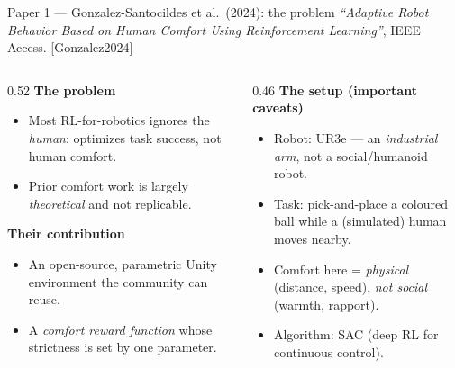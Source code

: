 \documentclass[aspectratio=169,10pt]{beamer}
\newcommand{\refnum}[1]{{\footnotesize\color{giuaccent}[#1]}}
\begin{document}
\begin{frame}{Paper 1 --- Gonzalez-Santocildes et al.\ (2024): the problem}
  \footnotesize \emph{``Adaptive Robot Behavior Based on Human Comfort Using Reinforcement Learning''}, IEEE Access. \refnum{Gonzalez2024}
  \vspace{0.4em}
  \begin{columns}[T]
    \begin{column}{0.52\textwidth}
      \textbf{The problem}
      \begin{itemize}\footnotesize
        \item Most RL-for-robotics ignores the \emph{human}: optimizes task success, not human comfort.
        \item Prior comfort work is largely \emph{theoretical} and \alert{not replicable}.
      \end{itemize}
      \textbf{Their contribution}
      \begin{itemize}\footnotesize
        \item An open-source, parametric \alert{Unity} environment the community can reuse.
        \item A \emph{comfort reward function} whose strictness is set by one parameter.
      \end{itemize}
    \end{column}
    \begin{column}{0.46\textwidth}
      \textbf{The setup (important caveats)}
      \begin{itemize}\footnotesize
        \item Robot: \alert{UR3e} --- an \emph{industrial arm}, not a social/humanoid robot.
        \item Task: pick-and-place a coloured ball while a (simulated) human moves nearby.
        \item Comfort here = \emph{physical} (distance, speed), \emph{not social} (warmth, rapport).
        \item Algorithm: \alert{SAC} (deep RL for continuous control).
      \end{itemize}
    \end{column}
  \end{columns}
\end{frame}
\end{document}
